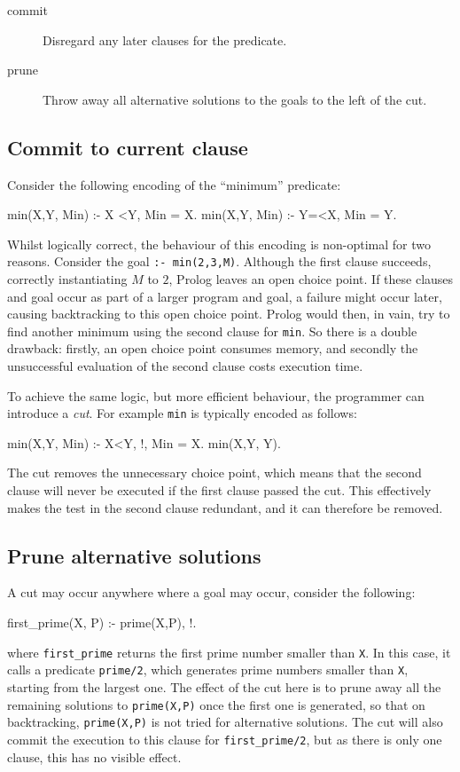 \begin{description}
\item[commit] Disregard any later clauses for the predicate.
\item[prune] Throw away all alternative solutions to the goals to the left of
 the cut.
\end{description}

\subsection{Commit to current clause}

Consider the following encoding of the ``minimum'' predicate:
\begin{code}
min(X,Y, Min) :- X <Y, Min = X.
min(X,Y, Min) :- Y=<X, Min = Y.
\end{code}
Whilst logically correct, the behaviour of this encoding is
non-optimal for two reasons.  Consider the goal {\tt :- min(2,3,M)}.
Although the first clause succeeds, correctly instantiating $M$ to
$2$, Prolog leaves an open choice point.  If these clauses and goal
occur as part of a larger program and goal, a failure might occur
later, causing backtracking to this open choice point. 
Prolog would then, in vain, try to find another minimum using the
second clause for {\tt min}.  So there is a double drawback:
firstly, an open choice point consumes memory, and secondly the
unsuccessful evaluation of the second clause costs execution time.

To achieve the same logic, but more efficient behaviour, the
programmer can introduce a {\it cut}.
For example {\tt min} is typically encoded as follows:
\begin{code}
min(X,Y, Min) :- X<Y, !, Min = X.
min(X,Y, Y).
\end{code}
The cut removes the unnecessary choice point, which means that the
second clause will never be executed if the first clause passed the
cut.  This effectively makes the test in the second clause redundant,
and it can therefore be removed.

  \subsection{Prune alternative solutions}
A cut may occur anywhere where a goal may occur, consider the following:
\begin{code}
first_prime(X, P) :-
    prime(X,P), !.
\end{code}
where \verb'first_prime' returns the first prime number smaller than \verb'X'.
In this case, it calls a predicate \verb'prime/2', which generates prime
numbers smaller than \verb'X', starting from the largest one. The effect of
the cut here is to prune away all the remaining solutions to \verb'prime(X,P)'
once the first one is generated, so that on backtracking, \verb'prime(X,P)'
is not tried for alternative solutions. The cut will also commit the execution
to this clause for \verb'first_prime/2', but as there is only one clause,
this has no visible effect.


